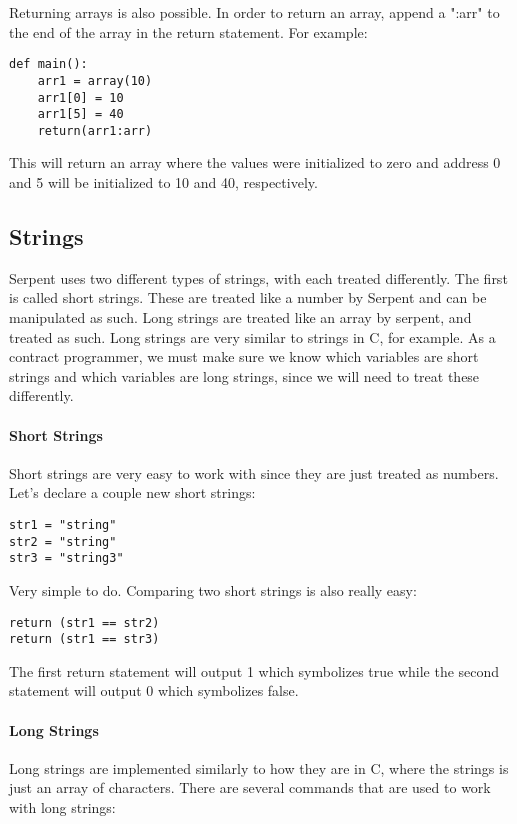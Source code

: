 \documentclass[12pt]{article}
\begin{document}
Returning arrays is also possible. In order to return an array, append a ":arr" to the end of the array in the return statement. For example:

\begin{lstlisting}
def main():
	arr1 = array(10)
	arr1[0] = 10
	arr1[5] = 40
	return(arr1:arr)
\end{lstlisting}

This will return an array where the values were initialized to zero and address 0 and 5 will be initialized to 10 and 40, respectively. \cite{Serpent}

\subsection{Strings}
	Serpent uses two different types of strings, with each treated differently. The first is called short strings. These are treated like a number by Serpent and can be manipulated as such. Long strings are treated like an array by serpent, and treated as such. Long strings are very similar to strings in C, for example. As a contract programmer, we must make sure we know which variables are short strings and which variables are long strings, since we will need to treat these differently. \cite{Serpent}

\paragraph{Short Strings}
	Short strings are very easy to work with since they are just treated as numbers. Let's declare a couple new short strings:
	
\begin{lstlisting}
str1 = "string"
str2 = "string"
str3 = "string3"
\end{lstlisting}

Very simple to do. Comparing two short strings is also really easy:

\begin{lstlisting}
return (str1 == str2)
return (str1 == str3)
\end{lstlisting}

The first return statement will output 1 which symbolizes true while the second statement will output 0 which symbolizes false. \cite{Serpent}

\paragraph{Long Strings}
Long strings are implemented similarly to how they are in C, where the strings is just an array of characters. There are several commands that are used to work with long strings:
\end{document}
